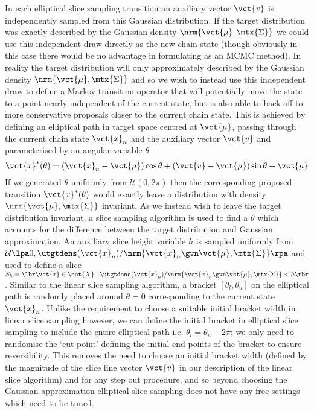 In each elliptical slice sampling transition an auxiliary vector $\vct{v}$ is independently sampled from this Gaussian distribution. If the target distribution was exactly described by the Gaussian density $\nrm{\vct{\mu},\mtx{\Sigma}}$ we could use this independent draw directly as the new chain state (though obviously in this case there would be no advantage in formulating as an \ac{MCMC} method). In reality the target distribution will only approximately described by the Gaussian density $\nrm{\vct{\mu},\mtx{\Sigma}}$ and so we wish to instead use this independent draw to define a Markov transition operator that will potentially move the state to a point nearly independent of the current state, but is also able to back off to more conservative proposals closer to the current chain state. This is achieved by defining an elliptical path in target space centred at $\vct{\mu}$, passing through the current chain state $\vct{x}_n$ and the auxiliary vector $\vct{v}$ and parameterised by an angular variable $\theta$
\begin{equation}\label{eq:elliptical-path}
  \vct{x}^*(\theta) = (\vct{x}_n - \vct{\mu}) \cos\theta + (\vct{v} - \vct{\mu}) \sin\theta + \vct{\mu}
\end{equation}
If we generated $\theta$ uniformly from $\mathcal{U}(0,2\pi)$ then the corresponding proposed transition $\vct{x}^*(\theta)$ would exactly leave a distribution with density $\nrm{\vct{\mu},\mtx{\Sigma}}$ invariant. As we instead wish to leave the target distribution invariant, a slice sampling algorithm is used to find a $\theta$  which accounts for the difference between the target distribution and Gaussian approximation. An auxiliary slice height variable $h$ is sampled uniformly from $\mathcal{U}\lpa 0,\utgtdens(\vct{x}_n) / \nrm{\vct{x}_n \gvn \vct{\mu}, \mtx{\Sigma}}\rpa$ and used to define a slice $S_h = \lbr \vct{x} \in \set{X} : \utgtdens(\vct{x}_n) / \nrm{\vct{x}_n \gvn \vct{\mu}, \mtx{\Sigma}} < h \rbr$. Similar to the linear slice sampling algorithm, a bracket $[\theta_l, \theta_u]$ on the elliptical path is randomly placed around $\theta = 0$ corresponding to the current state $\vct{x}_n$. Unlike the requirement to choose a suitable initial bracket width in linear slice sampling however, we can define the initial bracket in elliptical slice sampling to include the entire elliptical path i.e. $\theta_l = \theta_u - 2\pi$; we only need to randomise the `cut-point' defining the initial end-points of the bracket to ensure reversibility. This removes the need to choose an initial bracket width (defined by the magnitude of the slice line vector $\vct{v}$ in our description of the linear slice algorithm) and for any step out procedure, and so beyond choosing the Gaussian approximation elliptical slice sampling does not have any free settings which need to be tuned.

